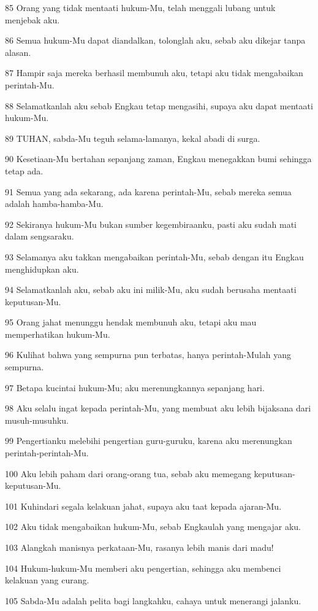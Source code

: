 \par 85 Orang yang tidak mentaati hukum-Mu, telah menggali lubang untuk menjebak aku.
\par 86 Semua hukum-Mu dapat diandalkan, tolonglah aku, sebab aku dikejar tanpa alasan.
\par 87 Hampir saja mereka berhasil membunuh aku, tetapi aku tidak mengabaikan perintah-Mu.
\par 88 Selamatkanlah aku sebab Engkau tetap mengasihi, supaya aku dapat mentaati hukum-Mu.
\par 89 TUHAN, sabda-Mu teguh selama-lamanya, kekal abadi di surga.
\par 90 Kesetiaan-Mu bertahan sepanjang zaman, Engkau menegakkan bumi sehingga tetap ada.
\par 91 Semua yang ada sekarang, ada karena perintah-Mu, sebab mereka semua adalah hamba-hamba-Mu.
\par 92 Sekiranya hukum-Mu bukan sumber kegembiraanku, pasti aku sudah mati dalam sengsaraku.
\par 93 Selamanya aku takkan mengabaikan perintah-Mu, sebab dengan itu Engkau menghidupkan aku.
\par 94 Selamatkanlah aku, sebab aku ini milik-Mu, aku sudah berusaha mentaati keputusan-Mu.
\par 95 Orang jahat menunggu hendak membunuh aku, tetapi aku mau memperhatikan hukum-Mu.
\par 96 Kulihat bahwa yang sempurna pun terbatas, hanya perintah-Mulah yang sempurna.
\par 97 Betapa kucintai hukum-Mu; aku merenungkannya sepanjang hari.
\par 98 Aku selalu ingat kepada perintah-Mu, yang membuat aku lebih bijaksana dari musuh-musuhku.
\par 99 Pengertianku melebihi pengertian guru-guruku, karena aku merenungkan perintah-perintah-Mu.
\par 100 Aku lebih paham dari orang-orang tua, sebab aku memegang keputusan-keputusan-Mu.
\par 101 Kuhindari segala kelakuan jahat, supaya aku taat kepada ajaran-Mu.
\par 102 Aku tidak mengabaikan hukum-Mu, sebab Engkaulah yang mengajar aku.
\par 103 Alangkah manisnya perkataan-Mu, rasanya lebih manis dari madu!
\par 104 Hukum-hukum-Mu memberi aku pengertian, sehingga aku membenci kelakuan yang curang.
\par 105 Sabda-Mu adalah pelita bagi langkahku, cahaya untuk menerangi jalanku.
